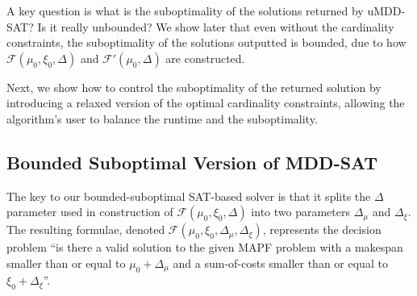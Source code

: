 \documentclass[jair,oneside,11pt]{article}
\begin{document}
A key question is what is the suboptimality of the solutions returned by uMDD-SAT? Is it really unbounded? We show later that even without the cardinality constraints, the suboptimality of the solutions outputted is bounded, due to how $\mathcal{F}(\mu_0,\xi_0, \Delta)$ and $\mathcal{F'}(\mu_0, \Delta)$ are constructed. 

Next, we show how to control the suboptimality of the returned solution by introducing a relaxed version of the optimal cardinality constraints, allowing the algorithm's user to balance the runtime and the suboptimality.


\subsection{Bounded Suboptimal Version of MDD-SAT}


The key to our bounded-suboptimal SAT-based solver is that it splits the $\Delta$ parameter used in construction of $\mathcal{F}(\mu_0,\xi_0, \Delta)$ into two parameters $\Delta_\mu$ and $\Delta_\xi$. 
The resulting formulae, denoted $\mathcal{F}(\mu_0,\xi_0, \Delta_\mu, \Delta_\xi)$, represents the decision problem ``is there a valid solution to the given MAPF problem with a makespan smaller than or equal to $\mu_0+\Delta_\mu$ and a sum-of-costs smaller than or equal to $\xi_0+\Delta_\xi$''.
 
\end{document}
